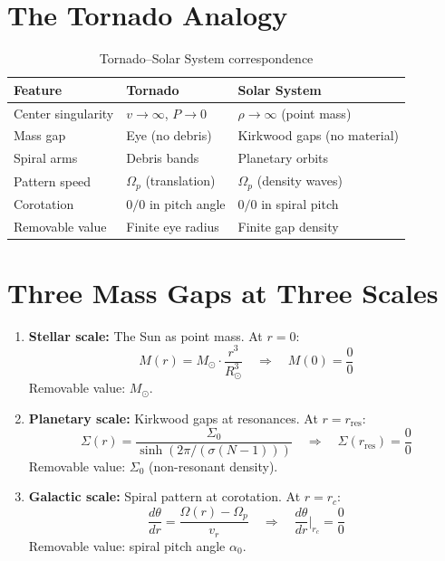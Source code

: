\documentclass[12pt]{article}
\begin{document}
\section{The Tornado Analogy}

\begin{table}[h]
\centering
\begin{tabular}{|l|l|l|}
\hline
\textbf{Feature} & \textbf{Tornado} & \textbf{Solar System} \\
\hline
Center singularity & $v \to \infty$, $P \to 0$ & $\rho \to \infty$ (point mass) \\
Mass gap & Eye (no debris) & Kirkwood gaps (no material) \\
Spiral arms & Debris bands & Planetary orbits \\
Pattern speed & $\Omega_p$ (translation) & $\Omega_p$ (density waves) \\
Corotation & $0/0$ in pitch angle & $0/0$ in spiral pitch \\
Removable value & Finite eye radius & Finite gap density \\
\hline
\end{tabular}
\caption{Tornado--Solar System correspondence}
\end{table}

\section{Three Mass Gaps at Three Scales}

\begin{enumerate}
\item \textbf{Stellar scale:} The Sun as point mass. At $r = 0$:
\begin{equation}
M(r) = M_\odot \cdot \frac{r^3}{R_\odot^3} \quad \Rightarrow \quad M(0) = \frac{0}{0}
\end{equation}
Removable value: $M_\odot$.

\item \textbf{Planetary scale:} Kirkwood gaps at resonances. At $r = r_{\text{res}}$:
\begin{equation}
\Sigma(r) = \frac{\Sigma_0}{\sinh(2\pi/(\sigma(N-1)))} \quad \Rightarrow \quad \Sigma(r_{\text{res}}) = \frac{0}{0}
\end{equation}
Removable value: $\Sigma_0$ (non-resonant density).

\item \textbf{Galactic scale:} Spiral pattern at corotation. At $r = r_c$:
\begin{equation}
\frac{d\theta}{dr} = \frac{\Omega(r) - \Omega_p}{v_r} \quad \Rightarrow \quad \frac{d\theta}{dr}\bigg|_{r_c} = \frac{0}{0}
\end{equation}
Removable value: spiral pitch angle $\alpha_0$.
\end{enumerate}
\end{document}
